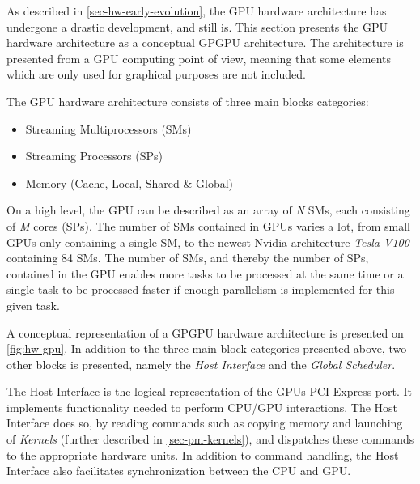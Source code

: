 As described in \cref{sec-hw-early-evolution}, the GPU hardware architecture has undergone a drastic development, and still is.
This section presents the GPU hardware architecture as a conceptual GPGPU architecture.
The architecture is presented from a GPU computing point of view, meaning that some elements which are only used for graphical purposes are not included.


The GPU hardware architecture consists of three main blocks categories:
\begin{itemize}
	\item Streaming Multiprocessors (SMs)
	\item Streaming Processors (SPs) 
	\item Memory (Cache, Local, Shared \& Global)
\end{itemize}

On a high level, the GPU can be described as an array of \textit{N} SMs, each consisting of \textit{M} cores (SPs). 
The number of SMs contained in GPUs varies a lot, from small GPUs only containing a single SM, to the newest Nvidia architecture \textit{Tesla V100} containing 84 SMs.
The number of SMs, and thereby the number of SPs, contained in the GPU enables more tasks to be processed at the same time or a single task to be processed faster if enough parallelism is implemented for this given task. 


A conceptual representation of a GPGPU hardware architecture is presented on \cref{fig:hw-gpu}.
In addition to the three main block categories presented above, two other blocks is presented, namely the \textit{Host Interface} and the \textit{Global Scheduler}.

The Host Interface is the logical representation of the GPUs PCI Express port.
It implements functionality needed to perform CPU/GPU interactions. 
The Host Interface does so, by reading commands such as copying memory and launching of \textit{Kernels} (further described in \cref{sec-pm-kernels}), and dispatches these commands to the appropriate hardware units.
In addition to command handling, the Host Interface also facilitates synchronization between the CPU and GPU. 

